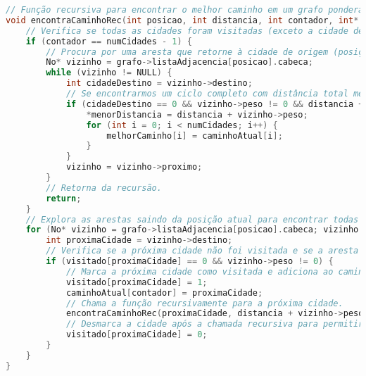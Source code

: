 \documentclass{article}
\begin{document}
\begin{lstlisting}[caption={grafo.c},label={lst:cod1},language=C]
// Função recursiva para encontrar o melhor caminho em um grafo ponderado usando lista de adjacência.
void encontraCaminhoRec(int posicao, int distancia, int contador, int* visitado, int* caminhoAtual, int* melhorCaminho, int numCidades, GrafoPonderado* grafo, int* menorDistancia) {
    // Verifica se todas as cidades foram visitadas (exceto a cidade de origem).
    if (contador == numCidades - 1) {
        // Procura por uma aresta que retorne à cidade de origem (posição 0) para formar um ciclo completo.
        No* vizinho = grafo->listaAdjacencia[posicao].cabeca;
        while (vizinho != NULL) {
            int cidadeDestino = vizinho->destino;
            // Se encontrarmos um ciclo completo com distância total menor que a menor distância conhecida, atualizamos o melhor caminho e a menor distância.
            if (cidadeDestino == 0 && vizinho->peso != 0 && distancia + vizinho->peso < *menorDistancia) {
                *menorDistancia = distancia + vizinho->peso;
                for (int i = 0; i < numCidades; i++) {
                    melhorCaminho[i] = caminhoAtual[i];
                }
            }
            vizinho = vizinho->proximo;
        }
        // Retorna da recursão.
        return;
    }
    // Explora as arestas saindo da posição atual para encontrar todas as cidades ainda não visitadas.
    for (No* vizinho = grafo->listaAdjacencia[posicao].cabeca; vizinho != NULL; vizinho = vizinho->proximo) {
        int proximaCidade = vizinho->destino;
        // Verifica se a próxima cidade não foi visitada e se a aresta atual não é uma aresta sem peso (peso != 0).
        if (visitado[proximaCidade] == 0 && vizinho->peso != 0) {
            // Marca a próxima cidade como visitada e adiciona ao caminho atual.
            visitado[proximaCidade] = 1;
            caminhoAtual[contador] = proximaCidade;
            // Chama a função recursivamente para a próxima cidade.
            encontraCaminhoRec(proximaCidade, distancia + vizinho->peso, contador + 1, visitado, caminhoAtual, melhorCaminho, numCidades, grafo, menorDistancia);
            // Desmarca a cidade após a chamada recursiva para permitir a exploração de outros caminhos.
            visitado[proximaCidade] = 0;
        }
    }
}


\end{lstlisting}
\end{document}
